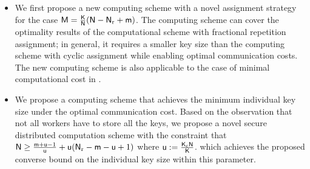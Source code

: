\documentclass[conference,letterpaper]{IEEEtran}
\begin{document}

\begin{itemize}
\item We first propose a new computing scheme with a novel assignment strategy for the case ${\sf M} = \frac{{\sf K}}{{\sf N}}({\sf N} - {\sf N}_{\rm r} + {\sf m})$. The computing scheme can cover the optimality results of the computational scheme with fractional repetition assignment; in general, it requires a smaller key size than the computing scheme with cyclic assignment while enabling optimal communication costs. The new computing scheme is also applicable to the case of minimal computational cost in \cite{wan2022secure}.   
\item We propose a computing scheme that achieves the minimum individual key size under the optimal communication cost. Based on the observation that not all workers have to store all the keys, we propose a novel secure distributed computation scheme with the constraint that ${\sf N} \geq \frac{{\sf m}+{\sf u}-1}{{\sf u}}+ {\sf u}({\sf N}_{\rm r}-{\sf m}-{\sf u}+1)$ where ${\sf u}:= \frac{{\sf K}_{\rm c} {\sf N}}{{\sf K}}$. which achieves the proposed converse bound on the individual key size within this parameter.
\end{itemize}
\end{document}
